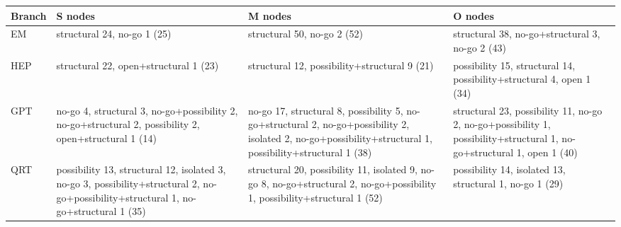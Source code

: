 \begin{tabular}{@{}l>{\raggedright\arraybackslash}p{3.6cm}>{\raggedright\arraybackslash}p{4.6cm}>{\raggedright\arraybackslash}p{4.2cm}@{}}\toprule
Branch & S nodes & M nodes & O nodes \\\midrule
EM & structural 24, no-go 1 (25) & structural 50, no-go 2 (52) & structural 38, no-go+\allowbreak{}structural 3, no-go 2 (43) \\
HEP & structural 22, open+\allowbreak{}structural 1 (23) & structural 12, possibility+\allowbreak{}structural 9 (21) & possibility 15, structural 14, possibility+\allowbreak{}structural 4, open 1 (34) \\
GPT & no-go 4, structural 3, no-go+\allowbreak{}possibility 2, no-go+\allowbreak{}structural 2, possibility 2, open+\allowbreak{}structural 1 (14) & no-go 17, structural 8, possibility 5, no-go+\allowbreak{}structural 2, no-go+\allowbreak{}possibility 2, isolated 2, no-go+\allowbreak{}possibility+\allowbreak{}structural 1, possibility+\allowbreak{}structural 1 (38) & structural 23, possibility 11, no-go 2, no-go+\allowbreak{}possibility 1, possibility+\allowbreak{}structural 1, no-go+\allowbreak{}structural 1, open 1 (40) \\
QRT & possibility 13, structural 12, isolated 3, no-go 3, possibility+\allowbreak{}structural 2, no-go+\allowbreak{}possibility+\allowbreak{}structural 1, no-go+\allowbreak{}structural 1 (35) & structural 20, possibility 11, isolated 9, no-go 8, no-go+\allowbreak{}structural 2, no-go+\allowbreak{}possibility 1, possibility+\allowbreak{}structural 1 (52) & possibility 14, isolated 13, structural 1, no-go 1 (29) \\
\bottomrule\end{tabular}
